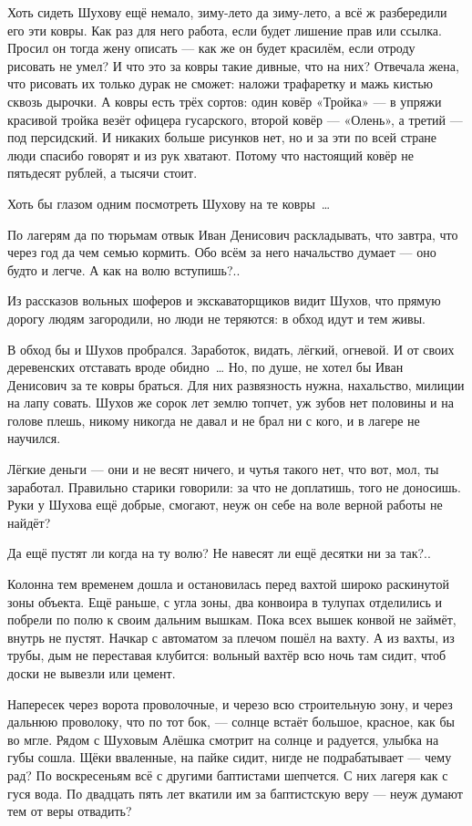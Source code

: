 Хоть сидеть Шухову ещё немало, зиму-лето да зиму-лето, а всё ж разбередили его эти ковры. Как 
раз для него работа, если будет лишение прав или ссылка. Просил он тогда жену описать --- как 
же он будет красилём, если отроду рисовать не умел? И что это за ковры такие дивные, что на 
них? Отвечала жена, что рисовать их только дурак не сможет: наложи трафаретку и мажь кистью 
сквозь дырочки. А ковры есть трёх сортов: один ковёр «Тройка» --- в упряжи красивой тройка 
везёт офицера гусарского, второй ковёр --- «Олень», а третий --- под персидский. И никаких 
больше рисунков нет, но и за эти по всей стране люди спасибо говорят и из рук хватают. Потому 
что настоящий ковёр не пятьдесят рублей, а тысячи стоит.

Хоть бы глазом одним посмотреть Шухову на те ковры~\dots{}

По лагерям да по тюрьмам отвык Иван Денисович раскладывать, что завтра, что через год да чем 
семью кормить. Обо всём за него начальство думает --- оно будто и легче. А как на волю 
вступишь?..

Из рассказов вольных шоферов и экскаваторщиков видит Шухов, что прямую дорогу людям 
загородили, но люди не теряются: в обход идут и тем живы.

В обход бы и Шухов пробрался. Заработок, видать, лёгкий, огневой. И от своих деревенских 
отставать вроде обидно~\dots{} Но, по душе, не хотел бы Иван Денисович за те ковры браться. Для 
них развязность нужна, нахальство, милиции на лапу совать. Шухов же сорок лет землю топчет, 
уж зубов нет половины и на голове плешь, никому никогда не давал и не брал ни с кого, и в 
лагере не научился.

Лёгкие деньги --- они и не весят ничего, и чутья такого нет, что вот, мол, ты заработал. 
Правильно старики говорили: за что не доплатишь, того не доносишь. Руки у Шухова ещё добрые, 
смогают, неуж он себе на воле верной работы не найдёт?

Да ещё пустят ли когда на ту волю? Не навесят ли ещё десятки ни за так?..

Колонна тем временем дошла и остановилась перед вахтой широко раскинутой зоны объекта. Ещё 
раньше, с угла зоны, два конвоира в тулупах отделились и побрели по полю к своим дальним 
вышкам. Пока всех вышек конвой не займёт, внутрь не пустят. Начкар с автоматом за плечом 
пошёл на вахту. А из вахты, из трубы, дым не переставая клубится: вольный вахтёр всю ночь там 
сидит, чтоб доски не вывезли или цемент.

Напересек через ворота проволочные, и черезо всю строительную зону, и через дальнюю 
проволоку, что по тот бок, --- солнце встаёт большое, красное, как бы во мгле. Рядом с Шуховым 
Алёшка смотрит на солнце и радуется, улыбка на губы сошла. Щёки вваленные, на пайке сидит, 
нигде не подрабатывает --- чему рад? По воскресеньям всё с другими баптистами шепчется. С них 
лагеря как с гуся вода. По двадцать пять лет вкатили им за баптистскую веру --- неуж думают тем 
от веры отвадить?

